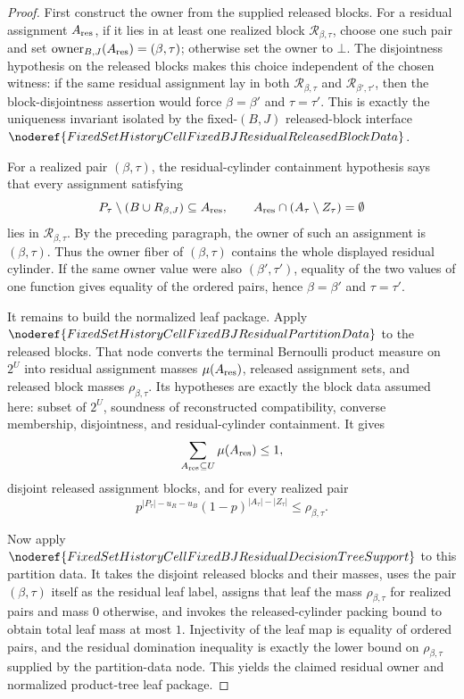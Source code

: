\begin{proof}
First construct the owner from the supplied released blocks.  For a residual
assignment \(A_{\rm res}\), if it lies in at least one realized block
\(\mathcal R_{\beta,\tau}\), choose one such pair and set
\(\operatorname{owner}_{B,J}(A_{\rm res})=(\beta,\tau)\); otherwise set the
owner to \(\bot\).  The disjointness hypothesis on the released blocks makes
this choice independent of the chosen witness: if the same residual
assignment lay in both \(\mathcal R_{\beta,\tau}\) and
\(\mathcal R_{\beta',\tau'}\), then the block-disjointness assertion would
force \(\beta=\beta'\) and \(\tau=\tau'\).  This is exactly the uniqueness
invariant isolated by the fixed-\((B,J)\) released-block interface
\(\noderef{FixedSetHistoryCellFixedBJResidualReleasedBlockData}\).

For a realized pair \((\beta,\tau)\), the residual-cylinder containment
hypothesis says that every assignment satisfying
\[
P_\tau\setminus(B\cup R_{\beta,J})\subseteq A_{\rm res},\qquad
A_{\rm res}\cap(A_\tau\setminus Z_\tau)=\emptyset
\]
lies in \(\mathcal R_{\beta,\tau}\).  By the preceding paragraph, the owner
of such an assignment is \((\beta,\tau)\).  Thus the owner fiber of
\((\beta,\tau)\) contains the whole displayed residual cylinder.  If the
same owner value were also \((\beta',\tau')\), equality of the two values of
one function gives equality of the ordered pairs, hence
\(\beta=\beta'\) and \(\tau=\tau'\).

It remains to build the normalized leaf package.  Apply
\(\noderef{FixedSetHistoryCellFixedBJResidualPartitionData}\) to the
released blocks.  That node converts the terminal Bernoulli product measure
on \(2^U\) into residual assignment masses \(\mu(A_{\rm res})\), released
assignment sets, and released block masses \(\rho_{\beta,\tau}\).  Its
hypotheses are exactly the block data assumed here: subset of \(2^U\),
soundness of reconstructed compatibility, converse membership,
disjointness, and residual-cylinder containment.  It gives
\[
\sum_{A_{\rm res}\subseteq U}\mu(A_{\rm res})\le1,
\]
disjoint released assignment blocks, and for every realized pair
\[
p^{|P_\tau|-u_R-u_B}(1-p)^{|A_\tau|-|Z_\tau|}
  \le \rho_{\beta,\tau}.
\]

Now apply
\(\noderef{FixedSetHistoryCellFixedBJResidualDecisionTreeSupport}\) to this
partition data.  It takes the disjoint released blocks and their masses,
uses the pair \((\beta,\tau)\) itself as the residual leaf label, assigns
that leaf the mass \(\rho_{\beta,\tau}\) for realized pairs and mass \(0\)
otherwise, and invokes the released-cylinder packing bound to obtain total
leaf mass at most \(1\).  Injectivity of the leaf map is equality of ordered
pairs, and the residual domination inequality is exactly the lower bound on
\(\rho_{\beta,\tau}\) supplied by the partition-data node.  This yields the
claimed residual owner and normalized product-tree leaf package.
\end{proof}
